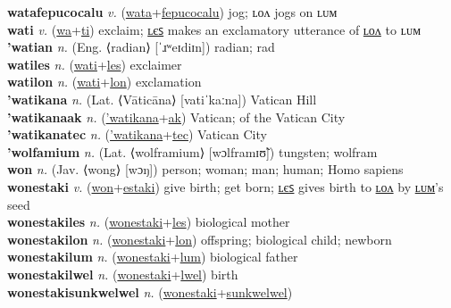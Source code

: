 \textbf{watafepucocalu} \textit{v.} (\hyperref[wata]{wata}+\hyperref[fepucocalu]{fepucocalu})
jog; ʟᴏᴧ jogs on ʟᴜᴍ \label{watafepucocalu} \\
\textbf{wati} \textit{v.} (\hyperref[wa]{wa}+\hyperref[ti]{ti})
exclaim; \hyperref[watiles]{ʟєꜱ} makes an exclamatory utterance of \hyperref[watilon]{ʟᴏᴧ} to ʟᴜᴍ \label{wati} \\
\textbf{'watian} \textit{n.} (Eng. ⟨radian⟩ [ˈɹʷeɪdiɪn])
radian; rad \label{'watian} \\
\textbf{watiles} \textit{n.} (\hyperref[wati]{wati}+\hyperref[les]{les})
exclaimer \label{watiles} \\
\textbf{watilon} \textit{n.} (\hyperref[wati]{wati}+\hyperref[lon]{lon})
exclamation \label{watilon} \\
\textbf{'watikana} \textit{n.} (Lat. ⟨Vāticāna⟩ [vatiˈkaːna])
Vatican Hill \label{'watikana} \\
\textbf{'watikanaak} \textit{n.} (\hyperref['watikana]{'watikana}+\hyperref[ak]{ak})
Vatican; of the Vatican City \label{'watikanaak} \\
\textbf{'watikanatec} \textit{n.} (\hyperref['watikana]{'watikana}+\hyperref[tec]{tec})
Vatican City \label{'watikanatec} \\
\textbf{'wolfamium} \textit{n.} (Lat. ⟨wolframium⟩ [wɔlframɪʊ̃])
tungsten; wolfram \label{'wolfamium} \\
\textbf{won} \textit{n.} (Jav. ⟨wong⟩ [wɔŋ])
person; woman; man; human; Homo sapiens \label{won} \\
\textbf{wonestaki} \textit{v.} (\hyperref[won]{won}+\hyperref[estaki]{estaki})
give birth; get born; \hyperref[wonestakiles]{ʟєꜱ} gives birth to \hyperref[wonestakilon]{ʟᴏᴧ} by \hyperref[wonestakilum]{ʟᴜᴍ}'s seed \label{wonestaki} \\
\textbf{wonestakiles} \textit{n.} (\hyperref[wonestaki]{wonestaki}+\hyperref[les]{les})
biological mother \label{wonestakiles} \\
\textbf{wonestakilon} \textit{n.} (\hyperref[wonestaki]{wonestaki}+\hyperref[lon]{lon})
offspring; biological child; newborn \label{wonestakilon} \\
\textbf{wonestakilum} \textit{n.} (\hyperref[wonestaki]{wonestaki}+\hyperref[lum]{lum})
biological father \label{wonestakilum} \\
\textbf{wonestakilwel} \textit{n.} (\hyperref[wonestaki]{wonestaki}+\hyperref[lwel]{lwel})
birth \label{wonestakilwel} \\
\textbf{wonestakisunkwelwel} \textit{n.} (\hyperref[wonestaki]{wonestaki}+\hyperref[sunkwelwel]{sunkwelwel})
